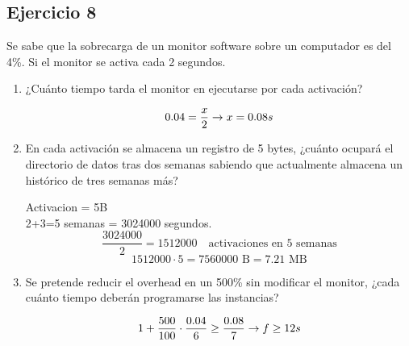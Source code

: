 \subsection{Ejercicio 8}
\noindent
Se sabe que la sobrecarga de un monitor software sobre un computador es del 4\%. Si el monitor se activa cada 2 segundos.
\begin{enumerate}
    \item ¿Cuánto tiempo tarda el monitor en ejecutarse por cada activación?
\begin{tcolorbox}[colback=white,colframe=cyan!50!black,fonttitle=\bfseries]
\[
0.04=\dfrac{x}{2}\rightarrow x=0.08s
\]
\end{tcolorbox}    
    \item En cada activación se almacena un registro de 5 bytes, ¿cuánto ocupará el directorio de datos tras dos semanas sabiendo que actualmente almacena un histórico de tres semanas más?
\begin{tcolorbox}[colback=white,colframe=cyan!50!black,fonttitle=\bfseries]
Activacion = 5B\\
2+3=5 semanas = 3024000 segundos.
\[
\dfrac{3024000}{2}=1512000\quad\text{activaciones en 5 semanas}
\]
\[
1512000\cdot 5=7560000\text{ B}=7.21\text{ MB}
\]
\end{tcolorbox}    
    \item Se pretende reducir el overhead en un 500\% sin modificar el monitor, ¿cada cuánto tiempo deberán programarse las instancias?
\begin{tcolorbox}[colback=white,colframe=cyan!50!black,fonttitle=\bfseries]
\[
1+\dfrac{500}{100}\cdot\dfrac{0.04}{6}\geq\dfrac{0.08}{7}\rightarrow f\geq 12s
\]
\end{tcolorbox}    
\end{enumerate}
